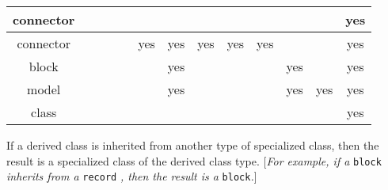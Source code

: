 \begin{table}[H]
{\begin{tabular}{|c|c|c|c|c|c|c|c|c|c|c|c|c|}
    connector         &                          &                           &                                            &                      &                          &                          &                          &                          &                            &                          &                        & \multirow{-2}{*}{\cellcolor{lightgray}yes} \\
    \hline
    connector         &                          &                           &                                            &                      & \cellcolor{lightgray}yes & \cellcolor{lightgray}yes & \cellcolor{lightgray}yes & \cellcolor{lightgray}yes & yes                        &                          &                        & \cellcolor{lightgray}yes                   \\
    \hline
    block             &                          &                           &                                            &                      &                          & \cellcolor{lightgray}yes &                          &                          &                            & yes                      &                        & \cellcolor{lightgray}yes                   \\
    \hline
    model             &                          &                           &                                            &                      &                          & \cellcolor{lightgray}yes &                          &                          &                            & \cellcolor{lightgray}yes & yes                    & \cellcolor{lightgray}yes                   \\
    \hline
    class             &                          &                           &                                            &                      &                          &                          &                          &                          &                            &                          &                        & yes                                        \\
    \hline
  \end{tabular}
  \ifpdf}\else\fi%
\end{table}

If a derived class is inherited from another type of specialized class,
then the result is a specialized class of the derived class type.
{[}\emph{For example, if a} \lstinline!block! \emph{inherits from a} \lstinline!record! \emph{, then the result
is a} \lstinline!block!\emph{.}{]}

